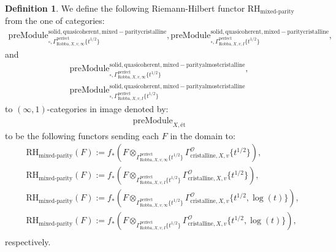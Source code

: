 \documentclass[12pt]{book}
\theoremstyle{definition}
\newtheorem{definition}{Definition}
\begin{document}
\begin{definition}
We define the following Riemann-Hilbert functor $\text{RH}_\text{mixed-parity}$ from the one of categories:
\begin{align}
\mathrm{preModule}^\mathrm{solid,quasicoherent,mixed-paritycristalline}_{\square,\Gamma^\mathrm{perfect}_{\text{Robba},X,v,\infty}\{t^{1/2}\}},
\mathrm{preModule}^\mathrm{solid,quasicoherent,mixed-paritycristalline}_{\square,\Gamma^\mathrm{perfect}_{\text{Robba},X,v,I}\{t^{1/2}\}}, 
\end{align}
and
\begin{align}
\mathrm{preModule}^\mathrm{solid,quasicoherent,mixed-parityalmostcristalline}_{\square,\Gamma^\mathrm{perfect}_{\text{Robba},X,v,\infty}\{t^{1/2}\}},\\
\mathrm{preModule}^\mathrm{solid,quasicoherent,mixed-parityalmostcristalline}_{\square,\Gamma^\mathrm{perfect}_{\text{Robba},X,v,I}\{t^{1/2}\}} 
\end{align}
to $(\infty,1)$-categories in image denoted by:
\begin{align}
\mathrm{preModule}_{X,\text{\'et}}
\end{align}
to be the following functors sending each $F$ in the domain to:
\begin{align}
&\text{RH}_\text{mixed-parity}(F):=f_*(F\otimes_{\Gamma^\mathrm{perfect}_{\text{Robba},X,v,\infty}\{t^{1/2}\}} \Gamma^\mathcal{O}_{\text{cristalline},X,v}\{t^{1/2}\}),\\
&\text{RH}_\text{mixed-parity}(F):=f_*(F\otimes_{\Gamma^\mathrm{perfect}_{\text{Robba},X,v,I}\{t^{1/2}\}} \Gamma^\mathcal{O}_{\text{cristalline},X,v}\{t^{1/2}\}),\\
&\text{RH}_\text{mixed-parity}(F):=f_*(F\otimes_{\Gamma^\mathrm{perfect}_{\text{Robba},X,v,\infty}\{t^{1/2}\}} \Gamma^\mathcal{O}_{\text{cristalline},X,v}\{t^{1/2},\log(t)\}),\\
&\text{RH}_\text{mixed-parity}(F):=f_*(F\otimes_{\Gamma^\mathrm{perfect}_{\text{Robba},X,v,I}\{t^{1/2}\}} \Gamma^\mathcal{O}_{\text{cristalline},X,v}\{t^{1/2},\log(t)\}),\\
\end{align}
respectively.

\end{definition}
\end{document}

